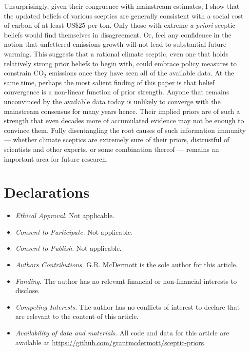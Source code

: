 \documentclass[smallextended]{svjour3}       %
\begin{document}
Unsurprisingly, given their congruence with mainstream estimates, I show
that the updated beliefs of various sceptics are generally consistent
with a social cost of carbon of at least US\$25 per ton. Only those with
extreme \emph{a priori} sceptic beliefs would find themselves in
disagreement. Or, feel any confidence in the notion that unfettered
emissions growth will not lead to substantial future warming. This
suggests that a rational climate sceptic, even one that holds relatively
strong prior beliefs to begin with, could embrace policy measures to
constrain CO\(_2\) emissions once they have seen all of the available
data. At the same time, perhaps the most salient finding of this paper
is that belief convergence is a non-linear function of prior strength.
Anyone that remains unconvinced by the available data today is unlikely
to converge with the mainstream consensus for many years hence. Their
implied priors are of such a strength that even decades more of
accumulated evidence may not be enough to convince them. Fully
disentangling the root causes of such information immunity --- whether
climate sceptics are extremely sure of their priors, distrustful of
scientists and other experts, or some combination thereof --- remains an
important area for future research.

\hypertarget{declarations}{%
\section*{Declarations}\label{declarations}}

\begin{itemize}
\item
  \emph{Ethical Approval.} Not applicable.
\item
  \emph{Consent to Participate.} Not applicable.
\item
  \emph{Consent to Publish.} Not applicable.
\item
  \emph{Authors Contributions.} G.R. McDermott is the sole author for
  this article.
\item
  \emph{Funding.} The author has no relevant financial or non-financial
  interests to disclose.
\item
  \emph{Competing Interests.} The author has no conflicts of interest to
  declare that are relevant to the content of this article.
\item
  \emph{Availability of data and materials.} All code and data for this
  article are available at
  \url{https://github.com/grantmcdermott/sceptic-priors}.
\end{itemize}



\end{document}
